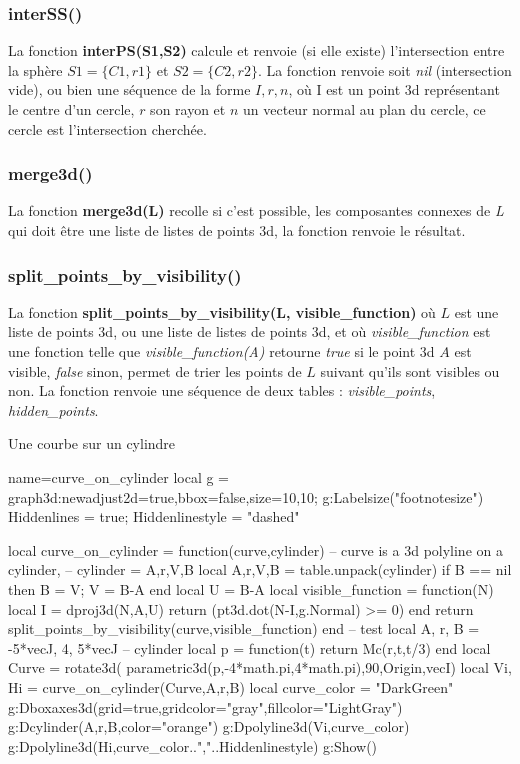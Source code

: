 \subsubsection{interSS()}
La fonction \textbf{interPS(S1,S2)} calcule et renvoie (si elle existe) l'intersection entre la sphère $S1=\{C1,r1\}$ et $S2=\{C2,r2\}$. La fonction renvoie soit \emph{nil} (intersection vide), ou bien une séquence de la forme $I,r,n$, où I est un point 3d représentant le centre d'un cercle, $r$ son rayon et $n$ un vecteur normal au plan du cercle, ce cercle est l'intersection cherchée. 

\subsubsection{merge3d()}
La fonction \textbf{merge3d(L)} recolle si c'est possible, les composantes connexes de \emph{L} qui doit être une liste de listes de points 3d, la fonction renvoie le résultat.

\subsubsection{split\_points\_by\_visibility()}
La fonction \textbf{split\_points\_by\_visibility(L, visible\_function)} où $L$ est une liste de points 3d, ou une liste de listes de points 3d, et où \emph{visible\_function} est une fonction telle que \emph{visible\_function(A)} retourne \emph{true} si le point 3d $A$ est visible, \emph{false} sinon, permet de trier les points de $L$ suivant qu'ils sont visibles ou non. La fonction renvoie une séquence de deux tables : \emph{visible\_points}, \emph{hidden\_points}.

\begin{demo}{Une courbe sur un cylindre}
\begin{luadraw}{name=curve_on_cylinder}
local g = graph3d:new{adjust2d=true,bbox=false,size={10,10}};
g:Labelsize("footnotesize")
Hiddenlines = true; Hiddenlinestyle = "dashed"

local curve_on_cylinder = function(curve,cylinder) 
-- curve is a 3d polyline on a cylinder, 
-- cylinder = {A,r,V,B}
    local  A,r,V,B = table.unpack(cylinder)
    if B == nil then B = V; V = B-A end
    local U = B-A
    local visible_function = function(N)
        local I = dproj3d(N,{A,U})
        return (pt3d.dot(N-I,g.Normal) >= 0)
    end
    return split_points_by_visibility(curve,visible_function)
end
-- test
local A, r, B = -5*vecJ, 4, 5*vecJ -- cylinder
local p = function(t) return Mc(r,t,t/3) end
local Curve = rotate3d( parametric3d(p,-4*math.pi,4*math.pi),90,{Origin,vecI})
local Vi, Hi = curve_on_cylinder(Curve,{A,r,B})
local curve_color = "DarkGreen"
g:Dboxaxes3d({grid=true,gridcolor="gray",fillcolor="LightGray"})
g:Dcylinder(A,r,B,{color="orange"})
g:Dpolyline3d(Vi,curve_color)
g:Dpolyline3d(Hi,curve_color..","..Hiddenlinestyle)
g:Show()
\end{luadraw}
\end{demo}

